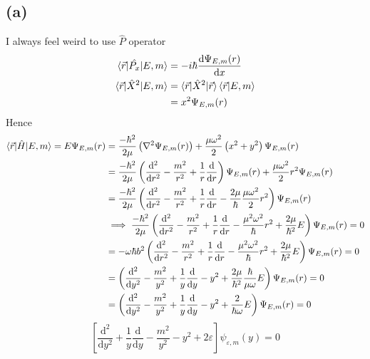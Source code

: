 \documentclass[letter, 10pts]{article}
\newcommand{\hb}{\hbar}
\begin{document}
\subsection*{(a)} 
I always feel weird to use $\hat{P}$ operator
\begin{align*}
	\braket{\vec{r} | \hat{P_x} | E, m} &= - i \hb \frac{\mathrm{d} \Psi_{E,m}(r)}{\mathrm{d} x} \\
	\braket{\vec{r} | \hat{X}^2 | E, m} &= \braket{\vec{r} | \hat{X}^2 | \vec{r}} \braket{\vec{r} | E,m}  \\
					    &= x^2 \Psi_{E,m} (r) \\
\end{align*}
Hence 
\begin{align*}
	\braket{\vec{r} | \hat{H} | E,m} = E \Psi_{E,m}(r) &= 
\frac{- \hb^2}{2 \mu}
\left(
	\nabla^2 \Psi_{E,m}(r) \right) 
	+ \frac{\mu \omega^2}{2} \left(x^2 + y^2\right) \Psi_{E,m}(r)
\\
				 &= 
				 \frac{- \hb^2}{2 \mu}
\left(
	\frac{\mathrm{d} ^2}{\mathrm{d} r^2} 
	- 
	\frac{m^2}{r^2}
	+ 
	\frac{1}{r} \frac{\mathrm{d} }{\mathrm{d} r}
\right) \Psi_{E,m} (r)
	+ \frac{\mu \omega^2}{2} r^2 \Psi_{E,m}(r)
\\
				 &= 
				 \frac{- \hb^2}{2 \mu}
\left(
	\frac{\mathrm{d} ^2}{\mathrm{d} r^2} 
	- 
	\frac{m^2}{r^2}
	+ 
	\frac{1}{r} \frac{\mathrm{d} }{\mathrm{d} r}
	- \frac{2 \mu}{\hb} \frac{\mu \omega^2}{2} r^2 \right) \Psi_{E,m}(r)
\\
				 &\implies 
				\frac{- \hb^2}{2 \mu}
\left(
	\frac{\mathrm{d} ^2}{\mathrm{d} r^2} 
	- 
	\frac{m^2}{r^2}
	+ 
	\frac{1}{r} \frac{\mathrm{d} }{\mathrm{d} r}
	-  \frac{\mu ^2 \omega^2}{\hb} r^2 + \frac{2\mu}{\hb^2} E \right) \Psi_{E,m}(r) 
	= 0
\\
				 &= -\omega \hb b^2
\left(
	\frac{\mathrm{d} ^2}{\mathrm{d} r^2} 
	- 
	\frac{m^2}{r^2}
	+ 
	\frac{1}{r} \frac{\mathrm{d} }{\mathrm{d} r}
	-  \frac{\mu ^2 \omega^2}{\hb} r^2 + \frac{2\mu}{\hb^2} E \right) \Psi_{E,m}(r) 
	= 0
\\
				 &= 
\left(
	\frac{\mathrm{d} ^2}{\mathrm{d} y^2} 
	- 
	\frac{m^2}{y^2}
	+ 
	\frac{1}{y} \frac{\mathrm{d} }{\mathrm{d} y}
	-   y^2 + \frac{2\mu}{\hb^2} \frac{\hb}{\mu \omega} E \right) \Psi_{E,m}(r) 
	= 0
\\
				 &=
\left(
	\frac{\mathrm{d} ^2}{\mathrm{d} y^2} 
	- 
	\frac{m^2}{y^2}
	+ 
	\frac{1}{y} \frac{\mathrm{d} }{\mathrm{d} y}
	-   y^2 + \frac{2}{\hb \omega} E \right) \Psi_{E,m}(r) 
	= 0
\\
\end{align*}
\[
\boxed{
\left[
\frac{\mathrm{d} ^2}{\mathrm{d} y^2}
+ 
\frac{1}{y} \frac{\mathrm{d} }{\mathrm{d} y}
- 
\frac{m^2}{y^2}
- y^2 + 
2 \varepsilon 
\right]
\psi_{\varepsilon, m}(y) = 0
}
\] 
\end{document}
